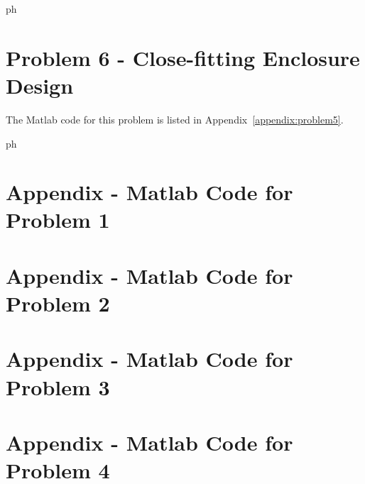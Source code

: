 {{\vspace{0.25cm}
ph







\newpage
\section*{Problem 6 - Close-fitting Enclosure Design}

The Matlab code for this problem is listed in Appendix~\ref{appendix:problem5}.

\vspace{0.25cm}
ph






\newpage
\section{Appendix - Matlab Code for Problem 1}
\label{appendix:problem1}





\newpage
\section{Appendix - Matlab Code for Problem 2}
\label{appendix:problem2}





\newpage
\section{Appendix - Matlab Code for Problem 3}
\label{appendix:problem3}





\newpage
\section{Appendix - Matlab Code for Problem 4}
\label{appendix:problem4}

}}
